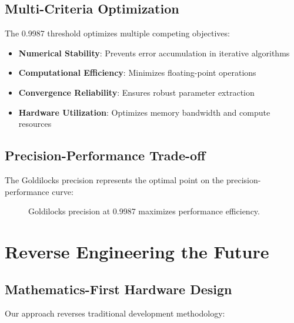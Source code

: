 \documentclass[11pt,a4paper]{article}
\begin{document}
\subsection{Multi-Criteria Optimization}
The 0.9987 threshold optimizes multiple competing objectives:

\begin{itemize}
\item \textbf{Numerical Stability}: Prevents error accumulation in iterative algorithms
\item \textbf{Computational Efficiency}: Minimizes floating-point operations
\item \textbf{Convergence Reliability}: Ensures robust parameter extraction
\item \textbf{Hardware Utilization}: Optimizes memory bandwidth and compute resources
\end{itemize}

\subsection{Precision-Performance Trade-off}
The Goldilocks precision represents the optimal point on the precision-performance curve:

\begin{figure}[H]
\centering
{}
\caption{Goldilocks precision at 0.9987 maximizes performance efficiency.}
\label{fig:goldilocks}
\end{figure}

\section{Reverse Engineering the Future}

\subsection{Mathematics-First Hardware Design}
Our approach reverses traditional development methodology:
\end{document}
